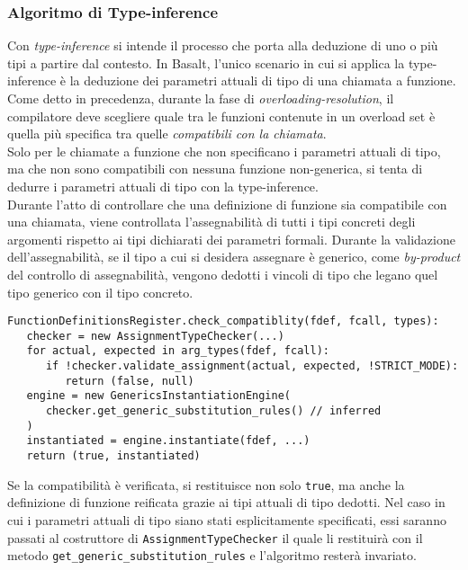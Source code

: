 \subsubsection{Algoritmo di Type-inference}
Con \textit{type-inference} si intende il processo che porta alla deduzione di uno o più 
tipi a partire dal contesto. In Basalt, l'unico scenario in cui si applica la type-inference è
la deduzione dei parametri attuali di tipo di una chiamata a funzione. \\

Come detto in precedenza, durante la fase di \textit{overloading-resolution}, il 
compilatore deve scegliere quale tra le funzioni contenute in un overload set è 
quella più specifica tra quelle \textit{compatibili con la chiamata}. \\

Solo per le chiamate a funzione che non specificano i parametri attuali di tipo, ma che non 
sono compatibili con nessuna funzione non-generica, si tenta di dedurre i parametri attuali
di tipo con la type-inference. \\

Durante l'atto di controllare che una definizione di funzione sia compatibile con una chiamata,
viene controllata l'assegnabilità di tutti i tipi concreti degli argomenti rispetto ai tipi 
dichiarati dei parametri formali. Durante la validazione dell'assegnabilità, se il tipo a cui si desidera
assegnare è generico, come \textit{by-product} del controllo di assegnabilità, vengono dedotti i vincoli di tipo
che legano quel tipo generico con il tipo concreto. \\

\vspace{0.5cm}
\begin{lstlisting}[frame=single]
FunctionDefinitionsRegister.check_compatiblity(fdef, fcall, types):
   checker = new AssignmentTypeChecker(...)
   for actual, expected in arg_types(fdef, fcall):
      if !checker.validate_assignment(actual, expected, !STRICT_MODE):
         return (false, null)
   engine = new GenericsInstantiationEngine(
      checker.get_generic_substitution_rules() // inferred
   )
   instantiated = engine.instantiate(fdef, ...)
   return (true, instantiated)
\end{lstlisting}
\vspace{0.5cm}

Se la compatibilità è verificata, si restituisce non solo \texttt{true}, ma anche la definizione 
di funzione reificata grazie ai tipi attuali di tipo dedotti. Nel caso in cui i parametri attuali di 
tipo siano stati esplicitamente specificati, essi saranno passati al costruttore di \texttt{AssignmentTypeChecker}
il quale li restituirà con il metodo \texttt{get\_generic\_substitution\_rules} e l'algoritmo resterà invariato. \\

